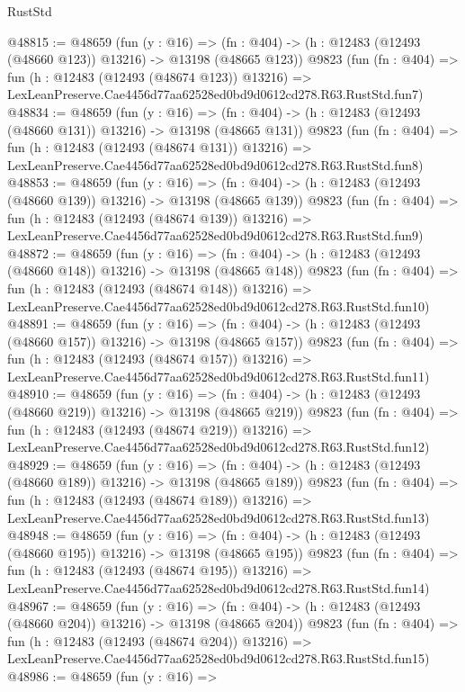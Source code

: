 \begin{lexlean}{RustStd}
\begin{coremodule}
@48815 := @48659
    (fun (y : @16) =>
    (fn : @404) -> (h : @12483 (@12493 (@48660 @123)) @13216) -> @13198 (@48665 @123))
    @9823
    (fun (fn : @404) =>
    fun (h : @12483 (@12493 (@48674 @123)) @13216) =>
    LexLeanPreserve.Cae4456d77aa62528ed0bd9d0612cd278.R63.RustStd.fun7)
@48834 := @48659
    (fun (y : @16) =>
    (fn : @404) -> (h : @12483 (@12493 (@48660 @131)) @13216) -> @13198 (@48665 @131))
    @9823
    (fun (fn : @404) =>
    fun (h : @12483 (@12493 (@48674 @131)) @13216) =>
    LexLeanPreserve.Cae4456d77aa62528ed0bd9d0612cd278.R63.RustStd.fun8)
@48853 := @48659
    (fun (y : @16) =>
    (fn : @404) -> (h : @12483 (@12493 (@48660 @139)) @13216) -> @13198 (@48665 @139))
    @9823
    (fun (fn : @404) =>
    fun (h : @12483 (@12493 (@48674 @139)) @13216) =>
    LexLeanPreserve.Cae4456d77aa62528ed0bd9d0612cd278.R63.RustStd.fun9)
@48872 := @48659
    (fun (y : @16) =>
    (fn : @404) -> (h : @12483 (@12493 (@48660 @148)) @13216) -> @13198 (@48665 @148))
    @9823
    (fun (fn : @404) =>
    fun (h : @12483 (@12493 (@48674 @148)) @13216) =>
    LexLeanPreserve.Cae4456d77aa62528ed0bd9d0612cd278.R63.RustStd.fun10)
@48891 := @48659
    (fun (y : @16) =>
    (fn : @404) -> (h : @12483 (@12493 (@48660 @157)) @13216) -> @13198 (@48665 @157))
    @9823
    (fun (fn : @404) =>
    fun (h : @12483 (@12493 (@48674 @157)) @13216) =>
    LexLeanPreserve.Cae4456d77aa62528ed0bd9d0612cd278.R63.RustStd.fun11)
@48910 := @48659
    (fun (y : @16) =>
    (fn : @404) -> (h : @12483 (@12493 (@48660 @219)) @13216) -> @13198 (@48665 @219))
    @9823
    (fun (fn : @404) =>
    fun (h : @12483 (@12493 (@48674 @219)) @13216) =>
    LexLeanPreserve.Cae4456d77aa62528ed0bd9d0612cd278.R63.RustStd.fun12)
@48929 := @48659
    (fun (y : @16) =>
    (fn : @404) -> (h : @12483 (@12493 (@48660 @189)) @13216) -> @13198 (@48665 @189))
    @9823
    (fun (fn : @404) =>
    fun (h : @12483 (@12493 (@48674 @189)) @13216) =>
    LexLeanPreserve.Cae4456d77aa62528ed0bd9d0612cd278.R63.RustStd.fun13)
@48948 := @48659
    (fun (y : @16) =>
    (fn : @404) -> (h : @12483 (@12493 (@48660 @195)) @13216) -> @13198 (@48665 @195))
    @9823
    (fun (fn : @404) =>
    fun (h : @12483 (@12493 (@48674 @195)) @13216) =>
    LexLeanPreserve.Cae4456d77aa62528ed0bd9d0612cd278.R63.RustStd.fun14)
@48967 := @48659
    (fun (y : @16) =>
    (fn : @404) -> (h : @12483 (@12493 (@48660 @204)) @13216) -> @13198 (@48665 @204))
    @9823
    (fun (fn : @404) =>
    fun (h : @12483 (@12493 (@48674 @204)) @13216) =>
    LexLeanPreserve.Cae4456d77aa62528ed0bd9d0612cd278.R63.RustStd.fun15)
@48986 := @48659
    (fun (y : @16) =>

\end{coremodule}
\end{lexlean}
